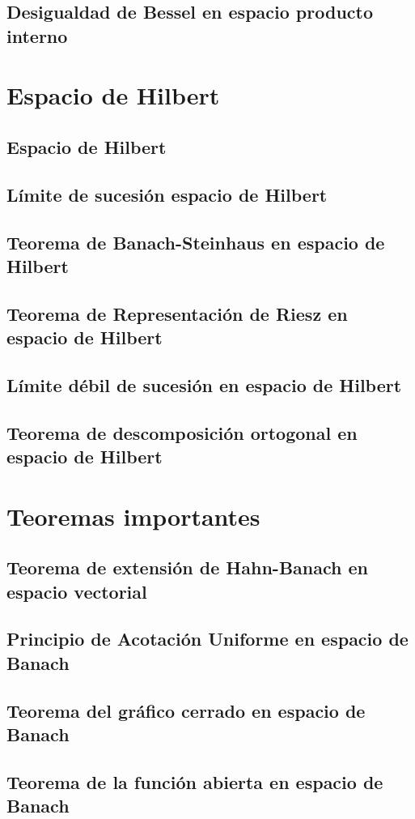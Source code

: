 \section{Desigualdad de Bessel en espacio producto interno}

\chapter{Espacio de Hilbert}

\section{Espacio de Hilbert}

\section{Límite de sucesión espacio de Hilbert}

\section{Teorema de Banach-Steinhaus en espacio de Hilbert}

\section{Teorema de Representación de Riesz en espacio de Hilbert}

\section{Límite débil de sucesión en espacio de Hilbert}

\section{Teorema de descomposición ortogonal en espacio de Hilbert}

\chapter{Teoremas importantes}

\section{Teorema de extensión de Hahn-Banach en espacio vectorial}

\section{Principio de Acotación Uniforme en espacio de Banach}

\section{Teorema del gráfico cerrado en espacio de Banach}

\section{Teorema de la función abierta en espacio de Banach}


